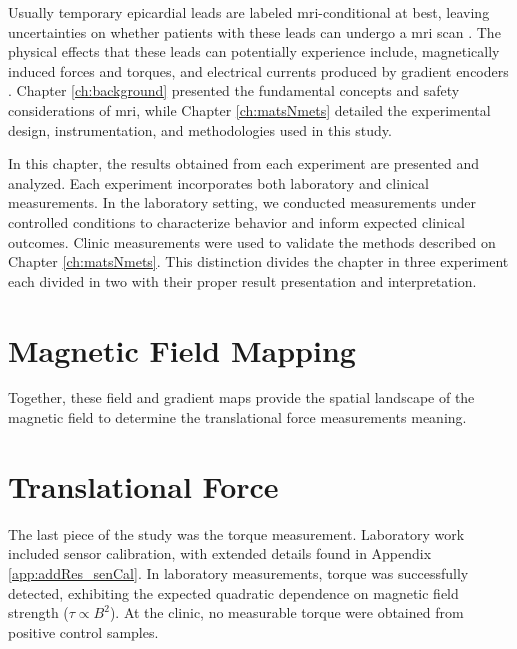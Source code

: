 

Usually temporary epicardial leads are labeled \gls{mri}-conditional at best, leaving uncertainties on whether patients with these leads can undergo a \gls{mri} scan \cite{fda2023testing,schaller2021}. The physical effects that these leads can potentially experience include, magnetically induced forces and torques, and electrical currents produced by gradient encoders \cite{panych2018}. Chapter \ref{ch:background} presented the fundamental concepts and safety considerations of \gls{mri}, while Chapter \ref{ch:matsNmets} detailed the experimental design, instrumentation, and methodologies used in this study. 

In this chapter, the results obtained from each experiment are presented and analyzed. Each experiment incorporates both laboratory and clinical measurements. In the laboratory setting, we conducted measurements under controlled conditions to characterize behavior and inform expected clinical outcomes. Clinic measurements were used to validate the methods described on Chapter \ref{ch:matsNmets}. This distinction divides the chapter in three experiment each divided in two with their proper result presentation and interpretation.

\section{Magnetic Field Mapping}
\label{sec:resMapField}


Together, these field and gradient maps provide the spatial landscape of the magnetic field to determine the translational force measurements meaning. 

\section{Translational Force}
\label{sec:resTranslationalForce}


The last piece of the study was the torque measurement. Laboratory work included sensor calibration, with extended details found in Appendix \ref{app:addRes_senCal}. In laboratory measurements, torque was successfully detected, exhibiting the expected quadratic dependence on magnetic field strength ($\tau \propto B^2$). At the clinic, no measurable torque were obtained from positive control samples.

